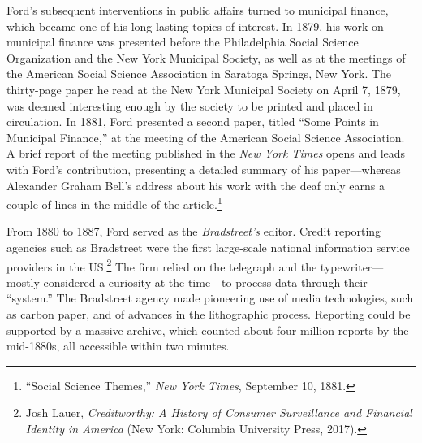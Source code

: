 \documentclass[openany,nobib]{tufte-book}
\begin{document}
Ford's subsequent interventions in public affairs turned to municipal
finance, which became one of his long-lasting topics of interest. In
1879, his work on municipal finance was presented before the
Philadelphia Social Science Organization and the New York Municipal
Society, as well as at the meetings of the American Social Science
Association in Saratoga Springs, New York. The thirty-page paper he read
at the New York Municipal Society on April 7, 1879, was deemed
interesting enough by the society to be printed and placed in
circulation. In 1881, Ford presented a second paper, titled ``Some
Points in Municipal Finance,'' at the meeting of the American Social
Science Association. A brief report of the meeting published in the
\emph{New York Times} opens and leads with Ford's contribution,
presenting a detailed summary of his paper---whereas Alexander Graham
Bell's address about his work with the deaf only earns a couple of lines
in the middle of the article.\footnote{``Social Science Themes,''
  \emph{New York Times}, September 10, 1881.}

\newpage From 1880 to 1887, Ford served as the \emph{Bradstreet's} editor. Credit
reporting agencies such as Bradstreet were the first large-scale
national information service providers in the US.\footnote{Josh Lauer,
  \emph{Creditworthy: A History of Consumer Surveillance and Financial
  Identity in America} (New York: Columbia University Press, 2017).} The
firm relied on the telegraph and the typewriter---mostly considered a
curiosity at the time---to process data through their ``system.'' The
Bradstreet agency made pioneering use of media technologies, such as
carbon paper, and of advances in the lithographic process. Reporting
could be supported by a massive archive, which counted about four
million reports by the mid-1880s, all accessible within two minutes.
\end{document}
